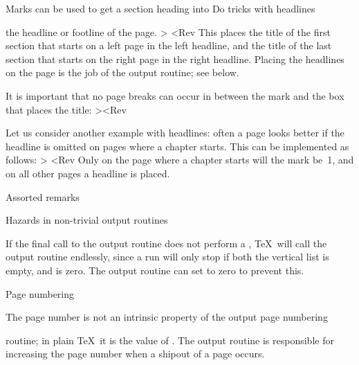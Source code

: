 \example Marks can be used to get a section heading into
\howto Do tricks with headlines\par
the headline or footline of the page.
\Ver>\def\section#1{ ... \mark{#1} ... }
\def\rightheadline{\hbox to \hsize
   {\headlinefont \botmark\hfil\pagenumber}}
\def\leftheadline{\hbox to \hsize
   {\headlinefont \pagenumber\hfil\firstmark}}<Rev
This places the title of the first section that starts on a 
left page in the left headline, and the title of the last section
that starts on the right page in the right headline.
Placing the headlines on the page is the job of the output routine;
see below.

It is important that no page breaks can occur in between the
mark and the box that places the title:
\Ver>\def\section#1{ ...
    \penalty\beforesectionpenalty
    \mark{#1}
    \hbox{ ... #1 ...}
    \nobreak
    \vskip\aftersectionskip
    \noindent}<Rev
\>

Let us consider
another example with headlines: often a page looks better if
the headline is omitted on pages where a chapter starts.
This can be implemented as follows:
\Ver>\def\chapter#1{ ... \def\chtitle{#1}\mark{1}\mark{0} ... }
\def\theheadline{\expandafter\ifx\firstmark1 
    \else \chapheadline \fi}<Rev
Only on the page where a chapter starts will the mark be~1,
and on all other pages a headline is placed.

\point Assorted remarks

\spoint Hazards in non-trivial output routines

If the final call to the output routine does not
perform a , \TeX\ will call the output
routine endlessly, since a run will only stop if both
the vertical list is empty, and 
is zero. The output routine can set 
to zero to prevent this.

\spoint Page numbering

The page number is not an intrinsic property of the output
\term page numbering\par
routine; in plain \TeX\ it is  the value of .
The output routine is responsible for increasing the
page number when a shipout of a  page occurs.


